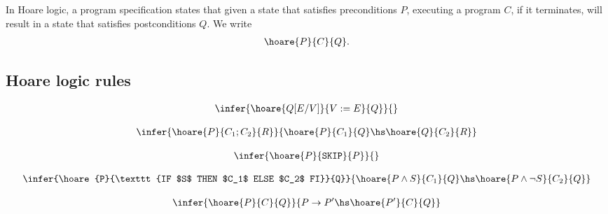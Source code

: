 \documentclass{article}
\begin{document}
\begin{definition}
    In Hoare logic, a program specification states that
    given a state that satisfies preconditions $P$, executing a program $C$, if it terminates,
    will result in a state that satisfies postconditions $Q$. We write
    \begin{align*}
        \hoare{P}{C}{Q}.
    \end{align*}
\end{definition}

\subsection{Hoare logic rules}

\begin{definition}
    \begin{align*}
        \infer{\hoare{Q[E/V]}{V:=E}{Q}}{}
    \end{align*}
\end{definition}

\begin{definition}
    \begin{align*}
        \infer{\hoare{P}{C_1; C_2}{R}}{\hoare{P}{C_1}{Q} \hs \hoare{Q}{C_2}{R}}
    \end{align*}
\end{definition}

\begin{definition}
    \begin{align*}
        \infer{\hoare{P}{\texttt{SKIP}}{P}}{}
    \end{align*}
\end{definition}

\begin{definition}
    \begin{align*}
        \infer{\hoare{P}{\texttt{IF $S$ THEN $C_1$ ELSE $C_2$ FI}}{Q}}{
            \hoare{P\wedge S}{C_1}{Q}\hs\hoare{P\wedge\neg S}{C_2}{Q}
        }
    \end{align*}
\end{definition}

\begin{definition}
    \begin{align*}
        \infer{\hoare{P}{C}{Q}}{P\to P'\hs\hoare{P'}{C}{Q}}
    \end{align*}
\end{definition}
\end{document}
